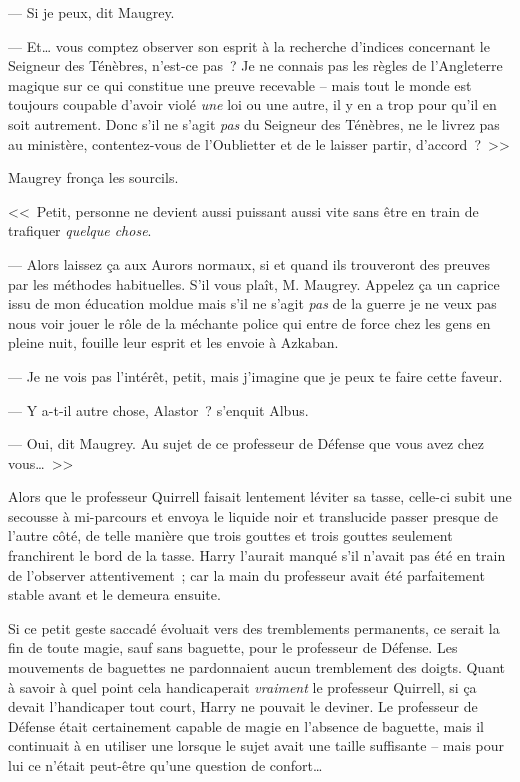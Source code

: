 --- Si je peux, dit Maugrey.

--- Et… vous comptez observer son esprit à la recherche d'indices concernant le Seigneur des Ténèbres, n'est-ce pas~? Je ne connais pas les règles de l'Angleterre magique sur ce qui constitue une preuve recevable -- mais tout le monde est toujours coupable d'avoir violé \emph{une} loi ou une autre, il y en a trop pour qu'il en soit autrement. Donc s'il ne s'agit \emph{pas} du Seigneur des Ténèbres, ne le livrez pas au ministère, contentez-vous de l'Oublietter et de le laisser partir, d'accord~?~>>

Maugrey fronça les sourcils.

<<~Petit, personne ne devient aussi puissant aussi vite sans être en train de trafiquer \emph{quelque chose}.

--- Alors laissez ça aux Aurors normaux, si et quand ils trouveront des preuves par les méthodes habituelles. S'il vous plaît, M. Maugrey. Appelez ça un caprice issu de mon éducation moldue mais s'il ne s'agit \emph{pas} de la guerre je ne veux pas nous voir jouer le rôle de la méchante police qui entre de force chez les gens en pleine nuit, fouille leur esprit et les envoie à Azkaban.

--- Je ne vois pas l'intérêt, petit, mais j'imagine que je peux te faire cette faveur.

--- Y a-t-il autre chose, Alastor~? s'enquit Albus.

--- Oui, dit Maugrey. Au sujet de ce professeur de Défense que vous avez chez vous…~>>



Alors que le professeur Quirrell faisait lentement léviter sa tasse, celle-ci subit une secousse à mi-parcours et envoya le liquide noir et translucide passer presque de l'autre côté, de telle manière que trois gouttes et trois gouttes seulement franchirent le bord de la tasse. Harry l'aurait manqué s'il n'avait pas été en train de l'observer attentivement~; car la main du professeur avait été parfaitement stable avant et le demeura ensuite.

Si ce petit geste saccadé évoluait vers des tremblements permanents, ce serait la fin de toute magie, sauf sans baguette, pour le professeur de Défense. Les mouvements de baguettes ne pardonnaient aucun tremblement des doigts. Quant à savoir à quel point cela handicaperait \emph{vraiment} le professeur Quirrell, si ça devait l'handicaper tout court, Harry ne pouvait le deviner. Le professeur de Défense était certainement capable de magie en l'absence de baguette, mais il continuait à en utiliser une lorsque le sujet avait une taille suffisante -- mais pour lui ce n'était peut-être qu'une question de confort…

